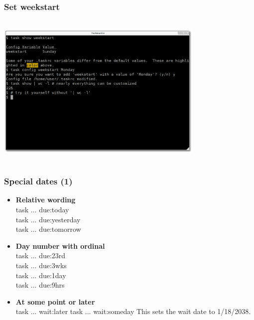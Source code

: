 \documentclass[t,handout]{beamer}
\begin{document}
\begin{frame}
\frametitle{Set weekstart}
\begin{center}
\includegraphics[width=10cm,height=7.5cm]{set_weekstart.png}
\end{center}
\end{frame}

\begin{frame}
\frametitle{Special dates (1)}
\begin{itemize}
\item \textbf{Relative wording} \\
task ... due:today \\
task ... due:yesterday \\
task ... due:tomorrow \\
\item \textbf{Day number with ordinal} \\
task ... due:23rd \\
task ... due:3wks \\
task ... due:1day \\
task ... due:9hrs \\
\item \textbf{At some point or later} \\
task ... wait:later
task ... wait:someday
This sets the wait date to 1/18/2038.
\end{itemize}
\end{frame}
\end{document}
